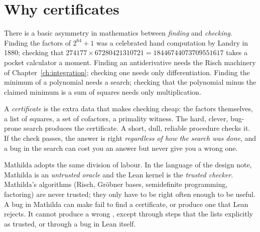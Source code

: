 \section{Why certificates}
\label{sec:cert-why}

There is a basic asymmetry in mathematics between \emph{finding} and
\emph{checking}. Finding the factors of \(2^{64}+1\) was a celebrated hand computation by Landry in 1880;
checking that \(274177 \times 67280421310721 = 18446744073709551617\) takes a
pocket calculator a moment. Finding an antiderivative needs the Risch machinery of
Chapter~\ref{ch:integration}; checking one needs only differentiation. Finding the
minimum of a polynomial needs a search; checking that the polynomial minus the
claimed minimum is a sum of squares needs only multiplication.

A \emph{certificate} is the extra data that makes checking cheap:
the factors themselves, a list of squares, a set of cofactors, a primality witness.
The hard, clever, bug-prone search produces the certificate. A short, dull, reliable
procedure checks it. If the check passes, the answer is right \emph{regardless of how
the search was done}, and a bug in the search can cost you an answer but never give
you a wrong one.%

Mathilda adopts the same division of labour. In the language of the design
note, Mathilda is an \emph{untrusted oracle} and the Lean
kernel is the \emph{trusted checker}. Mathilda's algorithms (Risch, Gröbner bases,
semidefinite programming, factoring) are never trusted; they only have to be right
often enough to be useful. A bug in Mathilda can make  fail to find a
certificate, or produce one that Lean rejects. It cannot produce a wrong
, except through steps that the  lists
explicitly as trusted, or through a bug in Lean itself.

